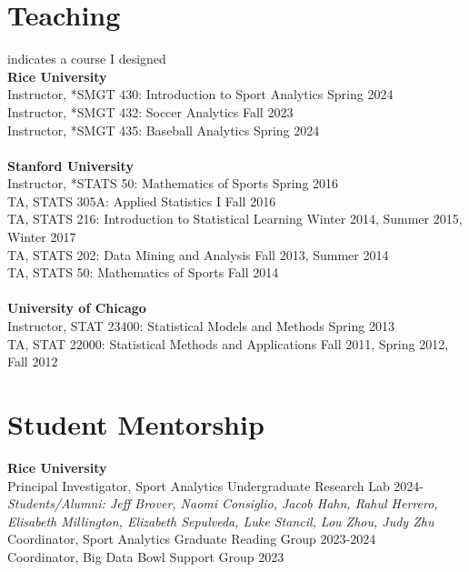 \documentclass{article}
\begin{document}
\section*{\sc Teaching}

\vspace{-4mm}\hfill * indicates a course I designed\\
{\bf Rice University}\\
Instructor, *SMGT 430: Introduction to Sport Analytics \hfill Spring 2024\\
Instructor, *SMGT 432: Soccer Analytics \hfill Fall 2023\\
Instructor, *SMGT 435: Baseball Analytics \hfill Spring 2024\\
~\\
{\bf Stanford University}\\
Instructor, *STATS 50: Mathematics of Sports \hspace{5mm} \hfill Spring 2016\\
TA, STATS 305A: Applied Statistics I \hfill Fall 2016\\
TA, STATS 216: Introduction to Statistical Learning \hfill Winter 2014, Summer 2015, Winter 2017\\
TA, STATS 202: Data Mining and Analysis \hfill Fall 2013, Summer 2014\\
TA, STATS 50: Mathematics of Sports \hfill Fall 2014\\
~\\
{\bf University of Chicago}\\
Instructor, STAT 23400: Statistical Models and Methods \hfill Spring 2013\\
TA, STAT 22000: Statistical Methods and Applications \hfill Fall 2011, Spring 2012, Fall 2012


\section*{\sc Student Mentorship}

{\bf Rice University}\\
Principal Investigator, Sport Analytics Undergraduate Research Lab \hfill 2024-\\
{\it Students/Alumni: Jeff Brover, Naomi Consiglio, Jacob Hahn, Rahul Herrero, Elisabeth Millington, Elizabeth Sepulveda, Luke Stancil, Lou Zhou, Judy Zhu}\\
Coordinator, Sport Analytics Graduate Reading Group \hfill 2023-2024\\
Coordinator, Big Data Bowl Support Group \hfill 2023
\end{document}
